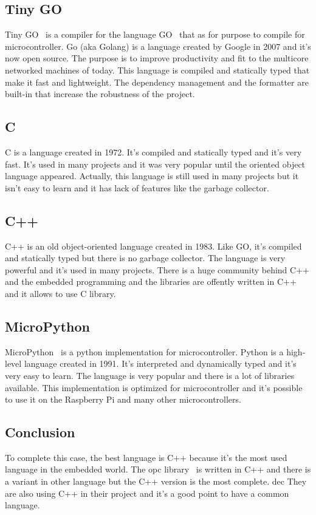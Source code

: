 \subsection{Tiny GO}
\label{subsec:go}
Tiny GO~\cite{tinygo} is a compiler for the language GO~\cite{go} that as for purpose to compile for microcontroller.
Go (aka Golang) is a language created by Google in 2007 and it's now open source.
The purpose is to improve productivity and fit to the multicore networked machines of today.
This language is compiled and statically typed that make it fast and lightweight.
The dependency management and the formatter are built-in that increase the robustness of the project.

\subsection{C}
\label{subsec:c}
C is a language created in 1972.
It's compiled and statically typed and it's very fast.
It's used in many projects and it was very popular until the oriented object language appeared.
Actually, this language is still used in many projects but it isn't easy to learn and it has lack of features like the garbage collector.


\subsection{C++}
\label{subsec:cpp}
C++ is an old object-oriented language created in 1983.
Like GO, it's compiled and statically typed but there is no garbage collector.
The language is very powerful and it's used in many projects.
There is a huge community behind C++ and the embedded programming and the libraries are offently written in C++ and it allows to use C library.

\subsection{MicroPython}
\label{subsec:micropython}
MicroPython~\cite{micropython} is a python implementation for microcontroller.
Python is a high-level language created in 1991.
It's interpreted and dynamically typed and it's very easy to learn.
The language is very popular and there is a lot of libraries available.
This implementation is optimized for microcontroller and it's possible to use it on the Raspberry Pi and many other microcontrollers.

\subsection{Conclusion}
\label{subsec:conclusion}
To complete this case, the best language is C++ because it's the most used language in the embedded world.
The \acrshort{opc} library~\cite{open62541_2023} is written in C++ and there is a variant in other language but the C++ version is the most complete.
\acrshort{dec} They are also using C++ in their project and it's a good point to have a common language.



